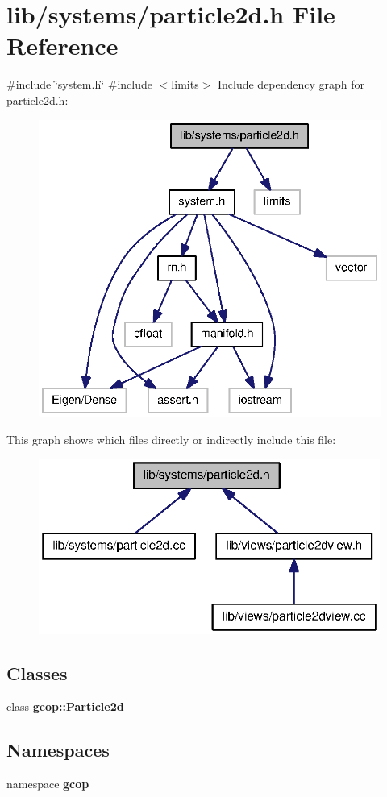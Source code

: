 \section{lib/systems/particle2d.h \-File \-Reference}
\label{particle2d_8h}
{\ttfamily \#include \char`\"{}system.\-h\char`\"{}}\*
{\ttfamily \#include $<$limits$>$}\*
\-Include dependency graph for particle2d.\-h\-:
\nopagebreak
\begin{figure}[H]
\begin{center}
\leavevmode
\includegraphics[width=336pt]{particle2d_8h__incl}
\end{center}
\end{figure}
\-This graph shows which files directly or indirectly include this file\-:
\nopagebreak
\begin{figure}[H]
\begin{center}
\leavevmode
\includegraphics[width=317pt]{particle2d_8h__dep__incl}
\end{center}
\end{figure}
\subsection*{\-Classes}
\begin{DoxyCompactItemize}
\item 
class {\bf gcop\-::\-Particle2d}
\end{DoxyCompactItemize}
\subsection*{\-Namespaces}
\begin{DoxyCompactItemize}
\item 
namespace {\bf gcop}
\end{DoxyCompactItemize}
